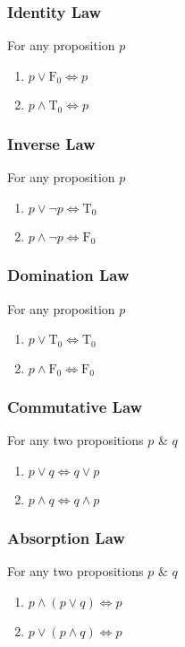 \documentclass{article}
\begin{document}
	\subsubsection{Identity Law}
	For any proposition $p$
	\begin{enumerate}[label=\roman*)]
		\item $p\lor \text{F}_0\Leftrightarrow p$
		\item $p\land \text{T}_0\Leftrightarrow p$
	\end{enumerate}

	\subsubsection{Inverse Law}
	For any proposition $p$
	\begin{enumerate}[label=\roman*)]
		\item $p\lor\neg p\Leftrightarrow \text{T}_0$
		\item $p\land\neg p\Leftrightarrow \text{F}_0$
	\end{enumerate}

	\subsubsection{Domination Law}
	For any proposition $p$
	\begin{enumerate}[label=\roman*)]
		\item $p\lor \text{T}_0\Leftrightarrow \text{T}_0$
		\item $p\land \text{F}_0\Leftrightarrow \text{F}_0$
	\end{enumerate}

	\subsubsection{Commutative Law}
	For any two propositions $p$ \& $q$
	\begin{enumerate}[label=\roman*)]
		\item $p\lor q\Leftrightarrow q\lor p$
		\item $p\land q\Leftrightarrow q\land p$
	\end{enumerate}

	\subsubsection{Absorption Law}
	For any two propositions $p$ \& $q$
	\begin{enumerate}[label=\roman*)]
		\item $p\land(p\lor q)\Leftrightarrow p$
		\item $p\lor(p\land q)\Leftrightarrow p$
	\end{enumerate}
\end{document}
